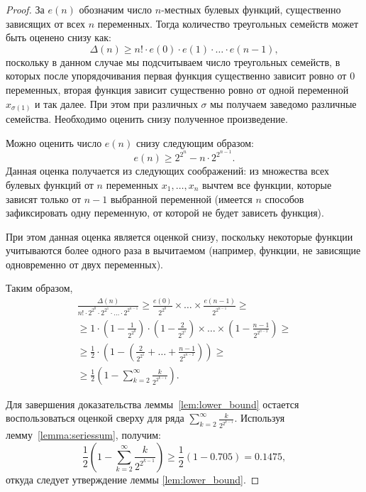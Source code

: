     \begin{proof}
        За $e(n)$ обозначим число $n$-местных булевых функций, существенно зависящих от всех $n$ переменных.
        Тогда количество треугольных семейств может быть оценено снизу как:
        \[
            \Delta(n) \ge n! \cdot e(0) \cdot e(1) \cdot \ldots \cdot e(n-1),
        \]
        поскольку в данном случае мы подсчитываем число треугольных семейств, в которых после упорядочивания первая функция существенно зависит ровно от $0$ переменных, вторая функция зависит существенно ровно от одной переменной $x_{\sigma(1)}$ и так далее. 
        При этом при различных $\sigma$ мы получаем заведомо различные семейства. 
        Необходимо оценить снизу полученное произведение.

        Можно оценить число $e(n)$ снизу следующим образом:
        \[
            e(n) \ge 2^{2^n} - n \cdot 2^{2^{n-1}}.
        \]
        Данная оценка получается из следующих соображений: из множества всех булевых функций от $n$ переменных $x_1, \ldots, x_n$ вычтем все функции, которые зависят только от $n-1$ выбранной переменной (имеется $n$ способов зафиксировать одну переменную, от которой не будет зависеть функция).

        При этом данная оценка является оценкой снизу, поскольку некоторые функции учитываются более одного раза в вычитаемом (например, функции, не зависящие одновременно от двух переменных).

        Таким образом,
        \begin{multline*}
            \frac{\Delta(n)}{n! \cdot 2^{2^0} \cdot 2^{2^1} \cdot \ldots \cdot 2^{2^{n-1}}} \ge 
            \frac{e(0)}{2^{2^0}} \times \ldots \times \frac{e(n-1)}{2^{2^{n-1}}} \ge \\
            \ge 1 \cdot \left( 1 - \frac{1}{2^{2^0}} \right) \cdot 
            \left( 1 - \frac{2}{2^{2^1}} \right) \times 
            \ldots \times 
            \left( 1 - \frac{n-1}{2^{2^{n-2}}} \right) \ge \\
            \ge \frac{1}{2} \cdot \left( 1 - \left( \frac{2}{2^{2^1}} + \ldots + \frac{n-1}{2^{2^{n-2}}} \right) \right) \ge \\
            \ge \frac{1}{2} \left( 1 - \sum_{k=2}^{\infty} \frac{k}{2^{2^{k-1}}} \right).
        \end{multline*}

        Для завершения доказательства леммы~\ref{lem:lower_bound} остается воспользоваться оценкой сверху для ряда $\sum_{k=2}^{\infty} \frac{k}{2^{2^{k-1}}}$.
        Используя лемму~\ref{lemma:seriessum}, получим:
        \[
            \frac{1}{2} \left( 1 - \sum_{k=2}^{\infty} \frac{k}{2^{2^{k-1}}} \right) \ge \frac{1}{2}(1 - 0.705) = 0.1475,
        \]
        откуда следует утверждение леммы \ref{lem:lower_bound}.
    \end{proof}

